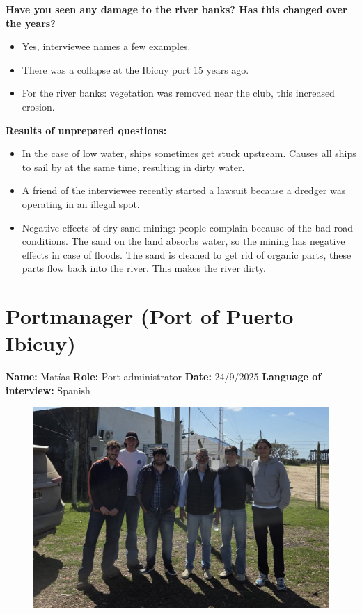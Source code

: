 \textbf{Have you seen any damage to the river banks? Has this changed over the years?}
\begin{itemize}
    \item Yes, interviewee names a few examples.
    \item There was a collapse at the Ibicuy port 15 years ago.
    \item For the river banks: vegetation was removed near the club, this increased erosion.
\end{itemize}

\textbf{Results of unprepared questions:}
\begin{itemize}
    \item In the case of low water, ships sometimes get stuck upstream. Causes all ships to sail by at the same time, resulting in dirty water.
    \item A friend of the interviewee recently started a lawsuit because a dredger was operating in an illegal spot.
    \item Negative effects of dry sand mining: people complain because of the bad road conditions. The sand on the land absorbs water, so the mining has negative effects in case of floods. The sand is cleaned to get rid of organic parts, these parts flow back into the river. This makes the river dirty.
\end{itemize}

\section{Portmanager (Port of Puerto Ibicuy)}
\textbf{Name:} Matías \newline
\textbf{Role:} Port administrator \newline
\textbf{Date:} 24/9/2025 \newline
\textbf{Language of interview:} Spanish

\begin{figure}[H]
    \centering
    \includegraphics[width=0.5\linewidth]{figures/appendixE/InterviewPort.jpeg}
\end{figure}

